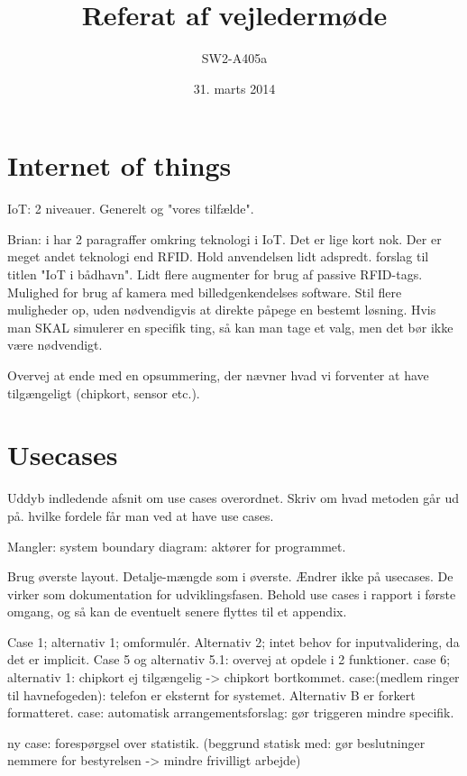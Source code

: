 \documentclass{article}
\begin{document}
\title{Referat af vejledermøde}
\author{SW2-A405a}
\date{31. marts 2014}
\maketitle
\section{Internet of things}

IoT: 2 niveauer. Generelt og "vores tilfælde".

Brian: i har 2 paragraffer omkring teknologi i IoT. Det er lige kort nok. Der er meget andet teknologi end RFID.
Hold anvendelsen lidt adspredt. forslag til titlen "IoT i bådhavn".
Lidt flere augmenter for brug af passive RFID-tags.
Mulighed for brug af kamera med billedgenkendelses software.
Stil flere muligheder op, uden nødvendigvis at direkte påpege en bestemt løsning. Hvis man SKAL simulerer en specifik ting, så kan man tage et valg, men det bør ikke være nødvendigt.

Overvej at ende med en opsummering, der nævner hvad vi forventer at have tilgængeligt (chipkort, sensor etc.).


\section{Usecases}

Uddyb indledende afsnit om use cases overordnet. Skriv om hvad metoden går ud på. hvilke fordele får man ved at have use cases.

Mangler: system boundary diagram: aktører for programmet.

Brug øverste layout. Detalje-mængde som i øverste. Ændrer ikke på usecases. De virker som dokumentation for udviklingsfasen. Behold use cases i rapport i første omgang, og så kan de eventuelt senere flyttes til et appendix.

Case 1; alternativ 1; omformulér. Alternativ 2; intet behov for inputvalidering, da det er implicit.
Case 5 og alternativ 5.1: overvej at opdele i 2 funktioner.
case 6; alternativ 1: chipkort ej tilgængelig -> chipkort bortkommet.
case:(medlem ringer til havnefogeden): telefon er eksternt for systemet. Alternativ B er forkert formatteret.
case: automatisk arrangementsforslag: gør triggeren mindre specifik.

ny case: forespørgsel over statistik. (beggrund statisk med: gør beslutninger nemmere for bestyrelsen -> mindre frivilligt arbejde)
\end{document}
